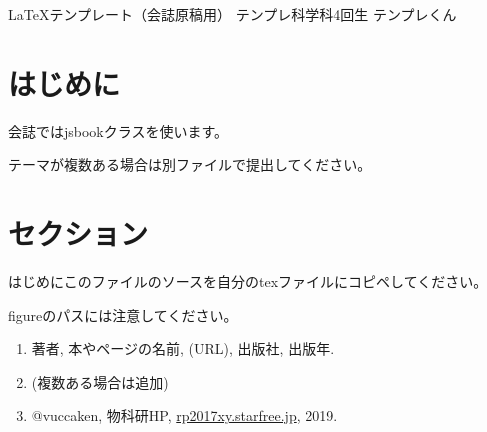 \documentclass[10pt,b5paper,papersize,dvipdfmx]{jsbook}
\begin{document}


\kaishititle%
  {\LaTeX テンプレート（会誌原稿用）}%
  {テンプレ科学科4回生}%
  {テンプレくん}%

%
\section*{はじめに}
会誌ではjsbookクラスを使います。\par
テーマが複数ある場合は別ファイルで提出してください。

%
\section{セクション}
はじめにこのファイルのソースを自分のtexファイルにコピペしてください。\par
figureのパスには注意してください。


\begin{sanko}
  \begin{enumerate}
    \item 著者, 本やページの名前, (URL), 出版社, 出版年.
    \item (複数ある場合は追加)
    \item @vuccaken, 物科研HP, \url{rp2017xy.starfree.jp}, 2019.
  \end{enumerate}
\end{sanko}
\end{document}
